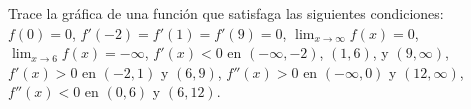 \item Trace la gráfica de una función que satisfaga las siguientes condiciones: $f(0) = 0$, $f'(-2) = f'(1) = f'(9) = 0$, $\lim_{x \to \infty} f(x) = 0$, $\lim_{x \to 6} f(x) = -\infty$, $f'(x) < 0$ en $(-\infty, -2)$, $(1, 6)$, y $(9, \infty)$, $f'(x) > 0$ en $(-2, 1)$ y $(6, 9)$, $f''(x) > 0$ en $(-\infty, 0)$ y $(12, \infty)$, $f''(x) < 0$ en $(0, 6)$ y $(6, 12)$.

